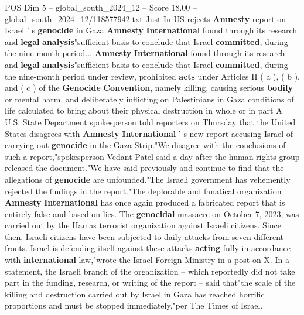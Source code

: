 \begin{textsample}{POS Dim 5 – global\_south\_2024\_12 – Score 18.00 – global\_south\_2024\_12/118577942.txt}  \label{ex:f5_pos_046}
Just In US rejects \textbf{Amnesty} report on Israel ' s \textbf{genocide} in Gaza \textbf{Amnesty} \textbf{International} found through its research and \textbf{legal} \textbf{analysis}"sufficient basis to conclude that Israel \textbf{committed}, during the nine-month period... \textbf{Amnesty} \textbf{International} found through its research and \textbf{legal} \textbf{analysis}"sufficient basis to conclude that Israel \textbf{committed}, during the nine-month period under review, prohibited \textbf{acts} under Articles II ( a ), ( b ), and ( c ) of the \textbf{Genocide} \textbf{Convention}, namely killing, causing serious \textbf{bodily} or mental harm, and deliberately inflicting on Palestinians in Gaza conditions of life calculated to bring about their physical destruction in whole or in part A U.S.
State Department spokesperson told reporters on Thursday that the United States disagrees with \textbf{Amnesty} \textbf{International} ' s new report accusing Israel of carrying out \textbf{genocide} in the Gaza Strip."We disagree with the conclusions of such a report,"spokesperson Vedant Patel said a day after the human rights group released the document."We have said previously and continue to find that the allegations of \textbf{genocide} are unfounded."The Israeli government has vehemently rejected the findings in the report."The deplorable and fanatical organization \textbf{Amnesty} \textbf{International} has once again produced a fabricated report that is entirely false and based on lies.
The \textbf{genocidal} massacre on October 7, 2023, was carried out by the Hamas terrorist organization against Israeli citizens.
Since then, Israeli citizens have been subjected to daily attacks from seven different fronts.
Israel is defending itself against these attacks \textbf{acting} fully in accordance with \textbf{international} law,"wrote the Israel Foreign Ministry in a post on X.
In a statement, the Israeli branch of the organization -- which reportedly did not take part in the funding, research, or writing of the report -- said that"the scale of the killing and destruction carried out by Israel in Gaza has reached horrific proportions and must be stopped immediately,"per The Times of Israel.

\end{textsample}
